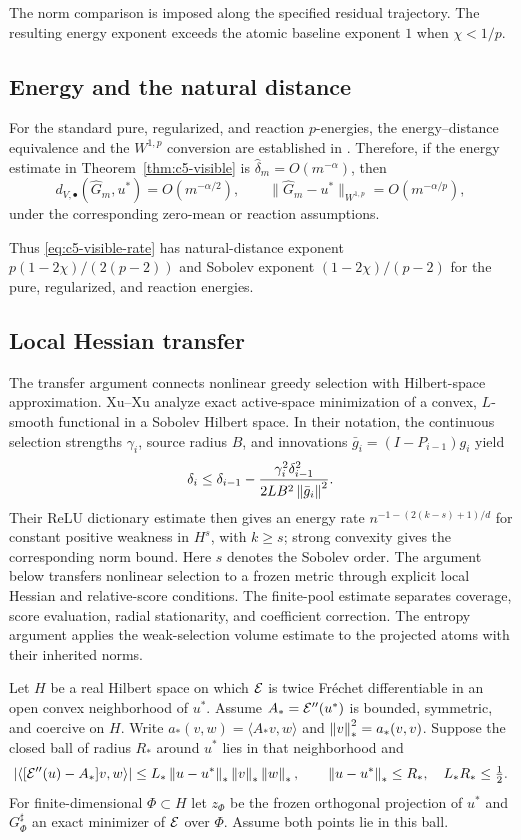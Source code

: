 \documentclass[11pt]{article}
\theoremstyle{remark}
\begin{document}
The norm comparison is imposed along the specified residual trajectory. The resulting energy exponent exceeds the atomic baseline exponent \(1\) when \(\chi<1/p\).

\subsection{Energy and the natural distance}
\label{sec:c5-natural}

For the standard pure, regularized, and reaction $p$-energies, the energy--distance
equivalence and the $W^{1,p}$ conversion are established in
\CGAEnergyMetricReference. Therefore, if the
energy estimate in Theorem~\ref{thm:c5-visible} is
$\widehat\delta_m=O(m^{-\alpha})$, then
\[
 d_{V,\bullet}(\widehat G_m,u^*)=O(m^{-\alpha/2}),\qquad
 \|\widehat G_m-u^*\|_{W^{1,p}}=O(m^{-\alpha/p}),
\]
under the corresponding zero-mean or reaction assumptions.

Thus \eqref{eq:c5-visible-rate} has natural-distance exponent \(p(1-2\chi)/(2(p-2))\) and Sobolev exponent \((1-2\chi)/(p-2)\) for the pure, regularized, and reaction energies.

\subsection{Local Hessian transfer}
\label{sec:c5-hessian}

The transfer argument connects nonlinear greedy selection with Hilbert-space approximation. Xu--Xu \cite[Theorem~3.1, equations~(17)--(19)]{XuXu2025} analyze exact active-space minimization of a convex, $L$-smooth functional in a Sobolev Hilbert space. In their notation, the continuous
selection strengths $\gamma_i$, source radius $B$, and innovations
$\bar g_i=(I-P_{i-1})g_i$ yield
\[
 \delta_i\leq\delta_{i-1}
 -\frac{\gamma_i^2\delta_{i-1}^2}{2LB^2\left\lVert\bar g_i\right\rVert^2}.
\]
Their ReLU dictionary estimate then gives an energy rate
$n^{-1-(2(k-s)+1)/d}$ for constant positive weakness in $H^s$,
with $k\geq s$; strong convexity gives the corresponding norm bound.
Here \(s\) denotes the Sobolev order. The argument below transfers nonlinear selection to a frozen metric through explicit local Hessian and relative-score conditions. The finite-pool estimate separates coverage, score evaluation, radial stationarity, and coefficient correction. The entropy argument applies the weak-selection volume estimate to the projected atoms with their inherited norms.

Let $H$ be a real Hilbert space on which $\mathcal E$ is twice Fr\'echet
differentiable in an open convex neighborhood of $u^*$.
Assume $A_*=\mathcal E''(u^*)$ is bounded, symmetric, and coercive on $H$.
Write $a_*(v,w)=\langle A_*v,w\rangle$ and $\left\lVert v\right\rVert_*^2=a_*(v,v)$.
Suppose the closed ball of radius $R_*$ around $u^*$ lies in that
neighborhood and
\begin{equation}
 |\langle[\mathcal E''(u)-A_*]v,w\rangle|
 \leq L_*\left\lVert u-u^*\right\rVert_*\left\lVert v\right\rVert_*\left\lVert w\right\rVert_*,
 \qquad \left\lVert u-u^*\right\rVert_*\leq R_*,\quad L_*R_*\leq\tfrac12 .
 \label{eq:c5-hessian}
\end{equation}
For finite-dimensional $\Phi\subset H$ let $z_\Phi$ be the frozen
orthogonal projection of $u^*$ and $G_\Phi^\sharp$ an exact minimizer
of $\mathcal E$ over $\Phi$. Assume both points lie in this ball.
\end{document}
